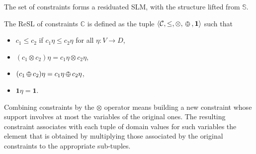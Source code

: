 \documentclass{llncs}
\def\monid{{\mathbf 0}}
\def\monop{\otimes}
\def\odiv{\, {\ominus\hspace{-7.7pt} \div} \,}
\def\monid{\mathbf{1}}
\begin{document}
\smallskip
The set of constraints forms a residuated SLM, with the structure
lifted from ${\mathbb S}$.

\begin{lemma}\label{prop:soft}
	The ReSL of constraints $\mathbb C$ is
	defined as the tuple $\langle {\mathcal C}, \leq, \monop, \odiv, \monid \rangle$ such that
	
	\begin{itemize}
		\item $c_1 \leq c_2$ if $c_1\eta\leq c_2\eta$ for all $\eta: V \rightarrow D$,
		\item $(c_1\monop c_2)\eta = c_1\eta\monop c_2\eta$, %
		\item $(c_1\odiv c_2)\eta = c_1\eta\odiv c_2\eta$, %
		\item $\monid \eta = \monid$.
	\end{itemize}
\end{lemma}


Combining constraints by the $\monop$ operator
means building a new constraint whose support involves at most
the variables of the original ones. The resulting constraint  associates with
each tuple of domain values for such variables the element
that is obtained by multiplying  those associated by the
original constraints to the appropriate sub-tuples.
%
\end{document}
